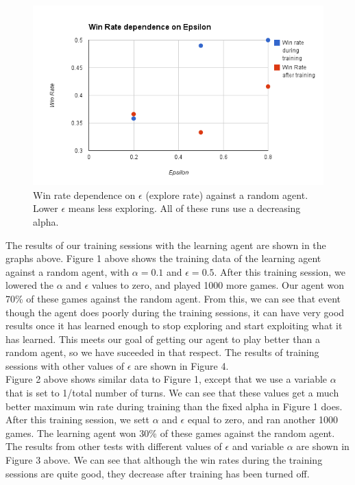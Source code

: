 \documentclass[letterpaper]{article}
\begin{document}
\begin{figure}
  \vspace{-2em}
  \begin{center}
    \includegraphics[width=\textwidth]{epsilonData.png}
    \vspace{-3em}
  \caption{Win rate dependence on $\epsilon$ (explore rate) against a random agent. Lower $\epsilon$ means less exploring. 
  All of these runs use a decreasing alpha.\label{epsilon}}
  \vspace{-1em}
  \end{center}
\end{figure}

The results of our training sessions with the learning agent are shown in the graphs above. Figure 1 above shows the training data of the learning agent against a random agent, with $\alpha=0.1$ and $\epsilon=0.5$. After this training session, we lowered the $\alpha$ and $\epsilon$ values to zero, and played 1000 more games. Our agent won 70\% of these games against the random agent. From this, we can see that event though the agent does poorly during the training sessions, it can have very good results once it has learned enough to stop exploring and start exploiting what it has learned. This meets our goal of getting our agent to play better than a random agent, so we have suceeded in that respect. The results of training sessions with other values of $\epsilon$ are shown in Figure 4.\\

Figure 2 above shows similar data to Figure 1, except that we use a variable $\alpha$ that is set to 1/total number of turns. We can see that these values get a much better maximum win rate during training than the fixed alpha in Figure 1 does. After this training session, we sett $\alpha$ and $\epsilon$ equal to zero, and ran another 1000 games. The learning agent won 30\% of these games against the random agent. The results from other tests with different values of $\epsilon$ and variable $\alpha$ are shown in Figure 3 above. We can see that although the win rates during the training sessions are quite good, they decrease after training has been turned off.\\
\end{document}
